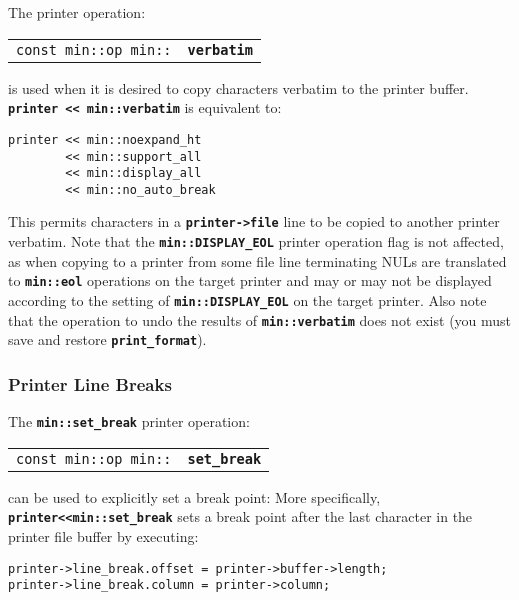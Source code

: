 \documentclass[12pt]{article}
\makeatletter
\newcommand{\TT}[1]{{\tt \bfseries #1}}
\newcommand{\ttindex}[1]{\index{#1@{\tt #1}}}
\newcommand{\EOL}{\penalty \exhyphenpenalty}
\newenvironment{indpar}[1][0.3in]%
	{\begin{list}{}%
		     {\setlength{\itemsep}{0in}%
		      \setlength{\topsep}{0in}%
		      \setlength{\parsep}{1ex}%
		      \setlength{\labelwidth}{#1}%
		      \setlength{\leftmargin}{#1}%
		      \addtolength{\leftmargin}{\labelsep}}%
	 \item}%
	{\end{list}}
\newcommand{\LABEL}[1]{\label{#1}}
\newcommand{\MINKEY}[1]%
	   {\TT{#1}\ttindex{min::#1}\ttindex{#1}}
\makeatother
\begin{document}
The printer operation:

\begin{indpar}[1em]\begin{tabular}{r@{}l}
\verb|const min::op min::| & \MINKEY{verbatim}
\LABEL{MIN::VERBATIM} \\
\end{tabular}\end{indpar}

is used when it is desired to copy characters verbatim to the
printer buffer.  \TT{printer <{}< min::\EOL verbatim} is equivalent to:

\begin{indpar}\begin{verbatim}
printer << min::noexpand_ht
        << min::support_all
        << min::display_all
        << min::no_auto_break
\end{verbatim}\end{indpar}

This permits characters in a \TT{printer->file} line to be copied
to another printer verbatim.  Note that
the \TT{min::\EOL DISPLAY\_\EOL EOL} printer operation flag
is not affected, as when copying to a printer from some file
line terminating NULs are translated to \TT{min::\EOL eol}
operations on the target printer and may or may not be
displayed according to the setting of
\TT{min::\EOL DISPLAY\_\EOL EOL} on the target printer.
Also note that the operation to undo the results
of \TT{min::\EOL verbatim} does not exist (you must save and restore
\TT{print\_\EOL format}).

\subsubsection{Printer Line Breaks}
\label{PRINTER-LINE-BREAKS}

The \TT{min::set\_\EOL break} printer operation:

\begin{indpar}[1em]\begin{tabular}{r@{}l}
\verb|const min::op min::| & \MINKEY{set\_\EOL break}
\LABEL{MIN::SET_BREAK} \\
\end{tabular}\end{indpar}

can be used to explicitly set a break point:
More specifically, \TT{printer<{}<min::set\_\EOL break} sets a break point after
the last character in the printer file buffer by executing:
\begin{indpar}\begin{verbatim}
printer->line_break.offset = printer->buffer->length;
printer->line_break.column = printer->column;
\end{verbatim}\end{indpar}
\end{document}
